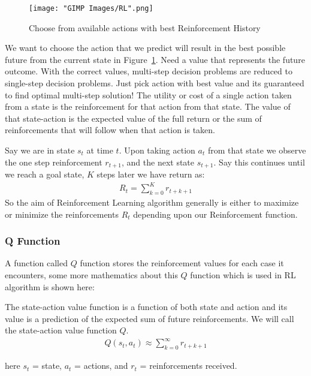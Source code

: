 \documentclass[12pt]{report}
\begin{document}
\begin{figure}[h]
  \centering
  \texttt{[image: "GIMP Images/RL".png]}
  \caption{Choose from available actions with best Reinforcement History}
  \label{fig:RL}
\end{figure}

We want to choose the action that we predict will result in the best possible future from the current state in Figure~\ref{fig:RL}. Need a value that represents the future outcome. With the correct values, multi-step decision problems are reduced to single-step decision problems. Just pick action with best value and its guaranteed to find optimal multi-step solution! The utility or cost of a single action taken from a state is the reinforcement for that action from that state. The value of that state-action is the expected value of the full return or the sum of reinforcements that will follow when that action is taken.\par
Say we are in state $s_t$ at time $t$. Upon taking action $a_t$ from that state we observe the one step reinforcement $r_{t+1}$, and the next state $s_{t+1}$. Say this continues until we reach a goal state, $K$ steps later we have return as:
 \begin{align*}
      R_t = \sum_{k=0}^K r_{t+k+1}
  \end{align*}
So the aim of Reinforcement Learning algorithm generally is either to maximize or minimize the reinforcements $R_t$ depending upon our Reinforcement function.

\subsubsection{Q Function}
A function called $Q$ function stores the reinforcement values for each case it encounters, some more mathematics about this $Q$ function which is used in RL algorithm is shown here:

The state-action value function is a function of both state and action and its value is a prediction of the expected sum of future reinforcements. We will call the state-action value function $Q$.
\begin{align*}
      Q(s_t,a_t) \approx \sum_{k=0}^\infty r_{t+k+1}
\end{align*}

here $s_t$ = state, $a_t$ = actions, and $r_t$ = reinforcements received.


\end{document}
